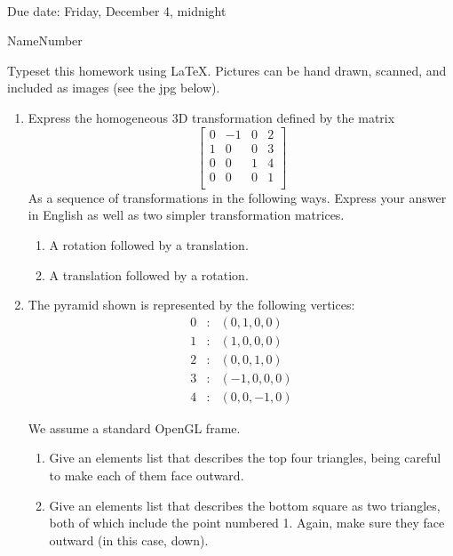 \documentclass{article}
\begin{document}
\\Due date:  Friday, December 4, midnight
\bigskip

\noindent Name\hrulefill Number \hrulefill

Typeset this homework using \LaTeX.  Pictures can be hand drawn,
scanned, and included as images (see the jpg below).

\begin{enumerate}

\item Express the homogeneous 3D transformation defined by the matrix
  \[
\left[  \begin{array}{cccc}
    0 & -1 & 0 & 2 \\
    1 & 0 & 0 & 3 \\
    0 & 0 & 1 & 4 \\
    0 & 0 & 0 & 1\\\end{array}\right]
\]
As a sequence of transformations in the following ways.
Express your answer in English as well as two simpler transformation
matrices.
\begin{enumerate}
\item  A rotation followed by a translation.
\item A translation followed by a rotation.
  \end{enumerate}

\item
  \begin{multicols}{2}
    The pyramid shown is represented by the following vertices:
  \begin{eqnarray*}
    0 &:& (0,1,0,0)\\
    1 &:& (1,0,0,0)\\
    2 &:& (0,0,1,0)\\
    3 &:& (-1,0,0,0)\\
    4 &:& (0,0,-1,0)
    \end{eqnarray*}
\columnbreak
  \end{multicols}
    We assume a standard OpenGL frame.
  \begin{enumerate}
  \item
    Give an elements list that describes the top four triangles, being
  careful to make each of them face outward.
\item Give an elements list that describes the bottom square as two
  triangles, both of which include the point numbered 1.  Again, make
  sure they face outward (in this case, down).
  

\end{enumerate}
\end{enumerate}
\end{document}
